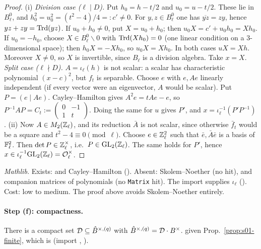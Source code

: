 \begin{proof}
(i) \emph{Division case ($\ell\mid D$).} Put $h_0=h-t/2$ and $u_0=u-t/2$. These lie in $B^0_\ell$, and
$h_0^2=u_0^2=(t^2-4)/4=:c'\ne0$. For $y,z\in B^0_\ell$ one has $\overline{yz}=zy$, hence $yz+zy=\mathrm{Trd}(yz)$. If $u_0+h_0\ne0$, put
$X=u_0+h_0$; then $u_0X=c'+u_0h_0=Xh_0$. If $u_0=-h_0$, choose $X\in B^0_\ell\smallsetminus0$ with $\mathrm{Trd}(Xh_0)=0$ (one linear
condition on a $3$-dimensional space); then $h_0X=-Xh_0$, so $u_0X=Xh_0$. In both cases $uX=Xh$. Moreover $X\ne0$, so $X$ is
invertible, since $B_\ell$ is a division algebra. Take $x=X$.
\emph{Split case ($\ell\nmid D$).} $A=\iota_\ell(h)$ is not scalar: a scalar has characteristic polynomial $(x-c)^2$, but $f_t$ is
separable. Choose $e$ with $e,Ae$ linearly independent (if every vector were an eigenvector, $A$ would be scalar). Put
$P=(e\mid Ae)$. Cayley--Hamilton gives $A^2e=tAe-e$, so $P^{-1}AP=C_t:=\left(\begin{smallmatrix}0&-1\\1&t\end{smallmatrix}\right)$.
Doing the same for $u$ gives $P'$, and $x=\iota_\ell^{-1}(P'P^{-1})$.
(ii) Now $A\in M_2(\mathbb{Z}_\ell)$, and its reduction $\bar A$ is not scalar, since otherwise $\bar f_t$ would be a square and
$t^2-4\equiv0\pmod\ell$. Choose $e\in\mathbb{Z}_\ell^2$ such that $\bar e,\bar A\bar e$ is a basis of $\mathbb{F}_\ell^2$. Then $\det P\in\mathbb{Z}_\ell^\times$,
i.e.\ $P\in\mathrm{GL}_2(\mathbb{Z}_\ell)$. The same holds for $P'$, hence $x\in\iota_\ell^{-1}\mathrm{GL}_2(\mathbb{Z}_\ell)=\mathcal{O}^\times_\ell$.
\end{proof}

\noindent\emph{Mathlib.} Exists:  and Cayley--Hamilton 
(). Absent: Skolem--Noether (no hit), and companion matrices of polynomials (no
\texttt{Matrix} hit). The import supplies $\iota_\ell$ (). Cost: low to medium. The proof
above avoids Skolem--Noether entirely.

\paragraph{Step (f): compactness.}

\begin{lemma}\label{lem:s02-sa-step-f}
There is a compact set $\mathcal D\subseteq\hat{B}^{\times,(q)}$ with $\hat{B}^{\times,(q)}=\mathcal D\cdot B^\times$.
\stproved{} given Prop.~\ref{prop:s01-finite}, which is \stformal{} (import ,
).
\end{lemma}

